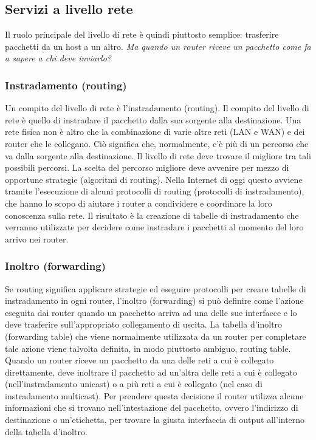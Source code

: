 \subsection{Servizi a livello rete}
Il ruolo principale del livello di rete è quindi piuttosto semplice: trasferire pacchetti da un host a un altro. \textit{Ma quando un router riceve un pacchetto come fa a sapere a chi deve inviarlo?}

\subsubsection{Instradamento (routing)}
Un compito del livello di rete è l'instradamento (routing). Il compito del livello di rete è quello di instradare il pacchetto dalla sua sorgente alla destinazione. Una rete fisica non è altro che la combinazione di varie altre reti (LAN e WAN) e dei router che le collegano. Ciò significa che, normalmente, c'è più di un percorso che va dalla sorgente alla destinazione. Il livello di rete deve trovare il migliore tra tali possibili percorsi. La scelta del percorso migliore deve avvenire per mezzo di opportune strategie (algoritmi di routing). Nella Internet di oggi questo avviene tramite l'esecuzione di alcuni protocolli di routing (protocolli di instradamento), che hanno lo scopo di aiutare i router a condividere e coordinare la loro conoscenza sulla rete. Il risultato è la creazione di tabelle di instradamento che verranno utilizzate per decidere come instradare i pacchetti al momento del loro arrivo nei router.

\subsubsection{Inoltro (forwarding)}
Se routing significa applicare strategie ed eseguire protocolli per creare tabelle di instradamento in ogni router, l'inoltro (forwarding) si può definire come l'azione eseguita dai router quando un pacchetto arriva ad una delle sue interfacce e lo deve trasferire sull'appropriato collegamento di uscita. La tabella d'inoltro (forwarding table) che viene normalmente utilizzata da un router per completare tale azione viene talvolta definita, in modo piuttosto ambiguo, routing table. Quando un router riceve un pacchetto da una delle reti a cui è collegato direttamente, deve inoltrare il pacchetto ad un'altra delle reti a cui è collegato (nell'instradamento unicast) o a più reti a cui è collegato (nel caso di instradamento multicast). Per prendere questa decisione il router utilizza alcune informazioni che si trovano nell'intestazione del pacchetto, ovvero l'indirizzo di destinazione o un'etichetta, per trovare la giusta interfaccia di output all'interno della tabella d'inoltro.

